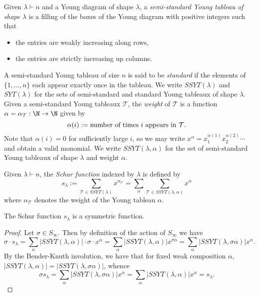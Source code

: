 \documentclass[12pt]{article}
\begin{document}
\begin{definition}\label{def:youngtableaux}
  Given $ \lambda\vdash n $ and a Young diagram of shape $ \lambda $, a \textit{semi-standard Young tableau of shape $ \lambda $} is a filling of the boxes of the Young diagram with positive integers such that 
  \begin{itemize}
    \item the entries are weakly increasing along rows,
    \item the entries are strictly increasing up columns.
  \end{itemize}
  A semi-standard Young tableau of size $ n $ is said to be \textit{standard} if the elements of $ \{1,\ldots,n\} $ each appear exactly once in the tableau. We write $ SSYT(\lambda) $ and $ SYT(\lambda) $ for the sets of semi-standard and standard Young tableaux of shape $ \lambda $. Given a semi-standard Young tableaux $ \mathcal{T} $, the \textit{weight} of $ \mathcal{T} $ is a function $ \alpha=\alpha_{\mathcal{T}}:\N \to \N$ given by
  \[
    \alpha(i) := \text{number of times $ i $ appears in $ \mathcal{T} $}.
  \]
  Note that $ \alpha(i) = 0 $ for sufficiently large $ i $, so we may write $ x^{\alpha} = x_{1}^{\alpha(1)}x_{2}^{\alpha(2)} \cdots $ and obtain a valid monomial. We write $ SSYT(\lambda,\alpha) $ for the set of semi-standard Young tableaux of shape $ \lambda $ and weight $ \alpha $.
\end{definition}


\begin{definition}\label{def:schur}
  Given $ \lambda\vdash n $, the \textit{Schur function} indexed by $ \lambda $ is defined by
 \[
  s_{\lambda} := \sum_{\mathcal{T}\in SSYT(\lambda) } x^{\alpha_{\mathcal{T}}} = \sum_{\alpha} \sum_{\mathcal{T}\in SSYT(\lambda,\alpha)} x^{\alpha}
\] 
where $ \alpha_{\mathcal{T}} $ denotes the weight of the Young tableau $ \alpha $.
\end{definition}

\begin{proposition}
  The Schur function $ s_{\lambda} $ is a symmetric function.
\end{proposition}


\begin{proof}
  Let $ \sigma\in S_{\infty}$. Then by definition of the action of $ S_{\infty} $ we have 
  \[
    \sigma \cdot s_{\lambda} = \sum_{\alpha} |SSYT(\lambda,\alpha)|\cdot \sigma\cdot x^{\alpha}= \sum_{\alpha} |SSYT(\lambda,\alpha)| x^{\sigma\alpha} = \sum_{\alpha} |SSYT(\lambda,\sigma\alpha)| x^{\alpha}.
  \]
  By the Bender-Knuth involution, we have that for fixed weak composition $ \alpha $, $ |SSYT(\lambda,\alpha)| = |SSYT(\lambda,\sigma \alpha)|$, whence 
  \[
    \sigma s_{\lambda} = \sum_{\alpha} |SSYT(\lambda, \sigma \alpha)|x^{\alpha} = \sum_{\alpha}|SSYT(\lambda,\alpha)|x^{\alpha} = s_{\lambda}.
  \]
\end{proof}
\end{document}
